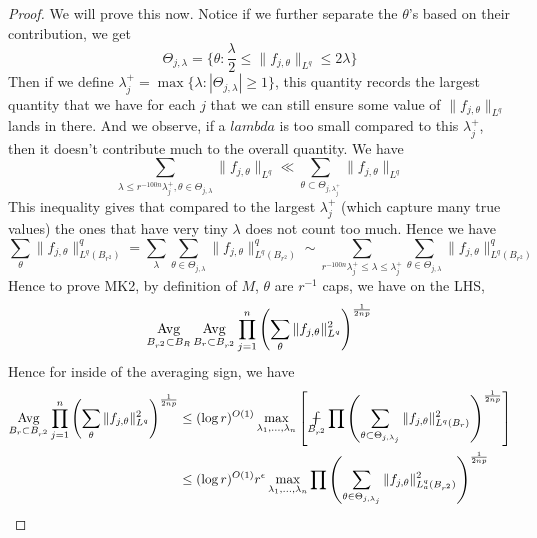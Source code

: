 \begin{proof}
We will prove this now. Notice if we further separate the $\theta$'s based on their contribution, we get
\begin{equation*}
    \Theta_{j,\lambda}=\{\theta: \frac{\lambda}{2}\leq\|f_{j,\theta}\|_{L^q}\leq 2\lambda\}
\end{equation*}
Then if we define $\lambda_j^+=\max\{\lambda: |\Theta_{j,\lambda}|\geq 1\}$, this quantity records the largest quantity that we have for each $j$ that we can still ensure some value of $\|f_{j,\theta}\|_{L^q}$ lands in there. And we observe, if a $lambda$ is too small compared to this $\lambda_j^+$, then it doesn't contribute much to the overall quantity. We have
\begin{equation*}
    \sum_{\lambda\leq r^{-100n}\lambda_j^+, \theta\in\Theta_{j,\lambda}}\|f_{j,\theta}\|_{L^q}\ll \sum_{\theta\subset\Theta_{j,\lambda_j^+}}\|f_{j,\theta}\|_{L^q}
\end{equation*}
This inequality gives that compared to the largest $\lambda_j^+$ (which capture many true values) the ones that have very tiny $\lambda$ does not count too much. Hence we have
\begin{equation*}
    \sum_\theta\|f_{j,\theta}\|_{L^q(B_{r^2})}^q=\sum_\lambda\sum_{\theta\in\Theta_{j,\lambda}}\|f_{j,\theta}\|_{L^q(B_{r^2})}^q\sim \sum_{r^{-100n}\lambda_j^+\leq\lambda\leq\lambda_j^+}\sum_{\theta\in\Theta_{j,\lambda}}\|f_{j,\theta}\|_{L^q(B_{r^2})}^q
\end{equation*}
Hence to prove MK2, by definition of $M$, $\theta$ are $r^{-1}$ caps, we have on the LHS,
\begin{equation*}
    \operatorname*{Avg}_{B_{r^2}\subset B_R}\operatorname*{Avg}_{B_r\subset B_{r^2}}\prod_{j=1}^n\left(\sum_{\theta}\|f_{j,\theta}\|_{L^q}^2 \right)^{\frac{1}{2np}}
\end{equation*}
Hence for inside of the averaging sign, we have
\begin{align*}
    \Avg_{B_r\subset B_{r^2}}\prod_{j=1}^n\left(\sum_\theta\|f_{j,\theta}\|_{L^q}^2 \right)^{\frac{1}{2np}}&\leq (\log{r})^{O(1)}\max_{\lambda_1, ..., \lambda_n}\left[\avint_{B_{r^2}}\prod\left(\sum_{\theta\subset\Theta_{j,\lambda_j}}\|f_{j,\theta}\|_{L^q(B_r)}^2\right)^{\frac{1}{2np}} \right]\\
    &\leq(\log{r})^{O(1)}r^\epsilon\max_{\lambda_1, ..., \lambda_n}\prod\left(\sum_{\theta\in\Theta_{j,\lambda_j}}\|f_{j,\theta}\|_{L_a^q(B_{r^2})}^2 \right)^{\frac{1}{2np}}
\end{align*}



\end{proof}

